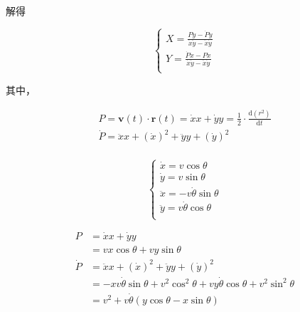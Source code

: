 \documentclass{article}
\begin{document}
解得

$$
\begin{cases}
	X=\frac{P\ddot{y}-\dot{P}\dot{y}}{\dot{x}\ddot{y}-\ddot{x}\dot{y}}\\
	Y=\frac{\dot{P}\dot{x}-P\ddot{x}}{\dot{x}\ddot{y}-\ddot{x}\dot{y}}\\
\end{cases}
$$

其中，

$$
\begin{array}{l}
	P=\mathbf{v}\left( t \right) \cdot \mathbf{r}\left( t \right) =\dot{x}x+\dot{y}y=\frac{1}{2}\cdot \frac{\mathrm{d}\left( r^2 \right)}{\mathrm{d}t}\\
	\dot{P}=\ddot{x}x+\left( \dot{x} \right) ^2+\ddot{y}y+\left( \dot{y} \right) ^2\\
\end{array}
$$

$$
\begin{cases}
	\dot{x}=v\cos \theta\\
	\dot{y}=v\sin \theta\\
	\ddot{x}=-v\dot{\theta}\sin \theta\\
	\ddot{y}=v\dot{\theta}\cos \theta\\
\end{cases}
$$

$$
\begin{aligned}
	P&=\dot{x}x+\dot{y}y\\
	&=vx\cos \theta +vy\sin \theta\\
	\dot{P}&=\ddot{x}x+\left( \dot{x} \right) ^2+\ddot{y}y+\left( \dot{y} \right) ^2\\
	&=-xv\dot{\theta}\sin \theta +v^2\cos ^2\theta +vy\dot{\theta}\cos \theta +v^2\sin ^2\theta\\
	&=v^2+v\dot{\theta}\left( y\cos \theta -x\sin \theta \right)\\
\end{aligned}
$$
\end{document}

